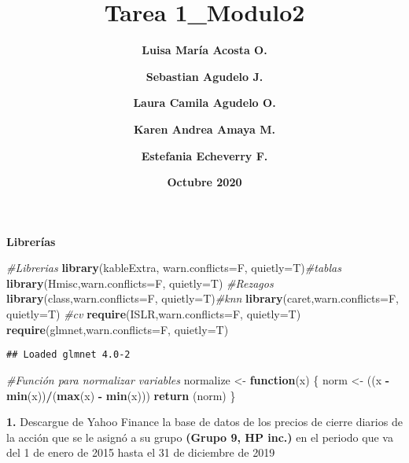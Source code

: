 \documentclass[
]{article}
\title{\textbf{Tarea 1\_Modulo2}}
\author{\textbf{Luisa María Acosta O.} \and \textbf{Sebastian Agudelo J.} \and \textbf{Laura Camila Agudelo O.} \and \textbf{Karen Andrea Amaya M.} \and \textbf{Estefania Echeverry F.}}
\date{\textbf{Octubre 2020}}
\newenvironment{Shaded}{\begin{snugshade}}{\end{snugshade}}
\newcommand{\CommentTok}[1]{\textcolor[rgb]{0.56,0.35,0.01}{\textit{#1}}}
\newcommand{\ControlFlowTok}[1]{\textcolor[rgb]{0.13,0.29,0.53}{\textbf{#1}}}
\newcommand{\DataTypeTok}[1]{\textcolor[rgb]{0.13,0.29,0.53}{#1}}
\newcommand{\DecValTok}[1]{\textcolor[rgb]{0.00,0.00,0.81}{#1}}
\newcommand{\KeywordTok}[1]{\textcolor[rgb]{0.13,0.29,0.53}{\textbf{#1}}}
\newcommand{\NormalTok}[1]{#1}
\newcommand{\OperatorTok}[1]{\textcolor[rgb]{0.81,0.36,0.00}{\textbf{#1}}}
\newcommand{\StringTok}[1]{\textcolor[rgb]{0.31,0.60,0.02}{#1}}
\begin{document}
\maketitle

\textbf{Librerías}

\begin{Shaded}
\begin{Highlighting}[]
\CommentTok{#Librerias}
\KeywordTok{library}\NormalTok{(kableExtra, }\DataTypeTok{warn.conflicts=}\NormalTok{F, }\DataTypeTok{quietly=}\NormalTok{T)}\CommentTok{#tablas}
\KeywordTok{library}\NormalTok{(Hmisc,}\DataTypeTok{warn.conflicts=}\NormalTok{F, }\DataTypeTok{quietly=}\NormalTok{T) }\CommentTok{#Rezagos}
\KeywordTok{library}\NormalTok{(class,}\DataTypeTok{warn.conflicts=}\NormalTok{F, }\DataTypeTok{quietly=}\NormalTok{T)}\CommentTok{#knn}
\KeywordTok{library}\NormalTok{(caret,}\DataTypeTok{warn.conflicts=}\NormalTok{F, }\DataTypeTok{quietly=}\NormalTok{T) }\CommentTok{#cv}
\KeywordTok{require}\NormalTok{(ISLR,}\DataTypeTok{warn.conflicts=}\NormalTok{F, }\DataTypeTok{quietly=}\NormalTok{T)}
\KeywordTok{require}\NormalTok{(glmnet,}\DataTypeTok{warn.conflicts=}\NormalTok{F, }\DataTypeTok{quietly=}\NormalTok{T) }
\end{Highlighting}
\end{Shaded}

\begin{verbatim}
## Loaded glmnet 4.0-2
\end{verbatim}

\begin{Shaded}
\begin{Highlighting}[]
\CommentTok{#Función para normalizar variables}
\NormalTok{normalize <-}\StringTok{ }\ControlFlowTok{function}\NormalTok{(x) \{}
\NormalTok{  norm <-}\StringTok{ }\NormalTok{((x }\OperatorTok{-}\StringTok{ }\KeywordTok{min}\NormalTok{(x))}\OperatorTok{/}\NormalTok{(}\KeywordTok{max}\NormalTok{(x) }\OperatorTok{-}\StringTok{ }\KeywordTok{min}\NormalTok{(x)))}
  \KeywordTok{return}\NormalTok{ (norm)}
\NormalTok{\}}
\end{Highlighting}
\end{Shaded}

\textbf{1.} Descargue de Yahoo Finance la base de datos de los precios
de cierre diarios de la acción que se le asignó a su grupo
\textbf{(Grupo 9, HP inc.)} en el periodo que va del 1 de enero de 2015
hasta el 31 de diciembre de 2019

\begin{Shaded}
\end{Shaded}
\end{document}
